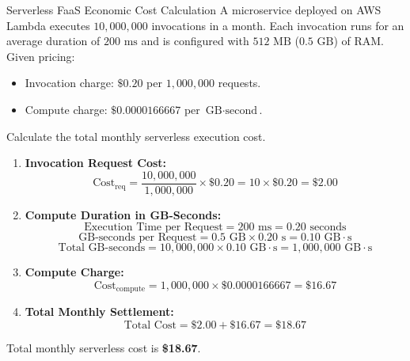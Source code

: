 \begin{solved}{Serverless FaaS Economic Cost Calculation}
\Given A microservice deployed on AWS Lambda executes $10,000,000$ invocations in a month. Each invocation runs for an average duration of $200\text{ ms}$ and is configured with $512\text{ MB}$ ($0.5\text{ GB}$) of RAM. Given pricing:
\begin{itemize}
  \item Invocation charge: $\$0.20$ per $1,000,000$ requests.
  \item Compute charge: $\$0.0000166667$ per $\text{GB}\cdot\text{second}$.
\end{itemize}
Calculate the total monthly serverless execution cost.
\Steps
\begin{enumerate}[leftmargin=*]
  \item \textbf{Invocation Request Cost:}
  \begin{equation}
  \text{Cost}_{\text{req}} = \frac{10,000,000}{1,000,000} \times \$0.20 = 10 \times \$0.20 = \$2.00
  \end{equation}
  \item \textbf{Compute Duration in GB-Seconds:}
  \begin{equation}
  \text{Execution Time per Request} = 200\text{ ms} = 0.20\text{ seconds}
  \end{equation}
  \begin{equation}
  \text{GB-seconds per Request} = 0.5\text{ GB} \times 0.20\text{ s} = 0.10\text{ GB}\cdot\text{s}
  \end{equation}
  \begin{equation}
  \text{Total GB-seconds} = 10,000,000 \times 0.10\text{ GB}\cdot\text{s} = 1,000,000\text{ GB}\cdot\text{s}
  \end{equation}
  \item \textbf{Compute Charge:}
  \begin{equation}
  \text{Cost}_{\text{compute}} = 1,000,000 \times \$0.0000166667 = \$16.67
  \end{equation}
  \item \textbf{Total Monthly Settlement:}
  \begin{equation}
  \text{Total Cost} = \$2.00 + \$16.67 = \$18.67
  \end{equation}
\end{enumerate}
\Answer Total monthly serverless cost is \textbf{\$18.67}.
\end{solved}

